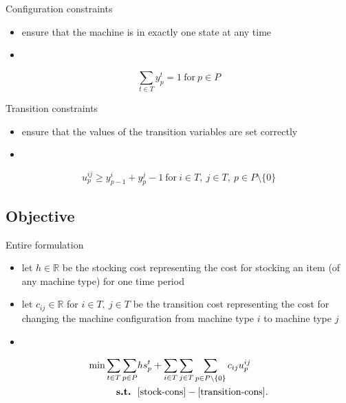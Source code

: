 \documentclass{beamer}
\begin{document}
\begin{frame}{Configuration constraints}
  \begin{itemize}
  \item ensure that the machine is in exactly one state at any
    time
  \item[]
  \end{itemize}
  \begin{equation}\sum\limits_{t \in T} y^t_p = 1~\text{for}~p \in P\label{config-cons}\end{equation}
\end{frame}

\begin{frame}{Transition constraints}
  \begin{itemize}
  \item ensure that the values of the transition variables are set
    correctly 
  \item[]
  \end{itemize}
  \begin{equation}u^{ij}_p \geq y^i_{p-1} + y^j_p -1~\text{for}~i \in T,~j \in T,~p \in P \setminus \{0\}\label{transition-cons}\end{equation}
\end{frame}

\subsection{Objective}
\begin{frame}{Entire formulation}
  \begin{itemize}
  \item let $h \in \mathbb{R}$ be the stocking cost representing
    the cost for stocking an item (of any machine type) for one
    time period
  \item let $c_{ij} \in \mathbb{R}$ for $i \in T,~j \in T$ be the
    transition cost representing the cost for changing the machine
    configuration from machine type $i$ to machine type $j$
  \item[]
  \end{itemize}
  \begin{align*}\min \sum\limits_{t \in T} \sum\limits_{p \in P} &h s^t_p + \sum\limits_{i \in T} \sum\limits_{j \in T} \sum\limits_{p \in P \setminus \{0\}} c_{ij} u^{ij}_p\\
    \textbf{s.t.}~~&\eqref{stock-cons} - \eqref{transition-cons}.
  \end{align*}
\end{frame}
\end{document}
